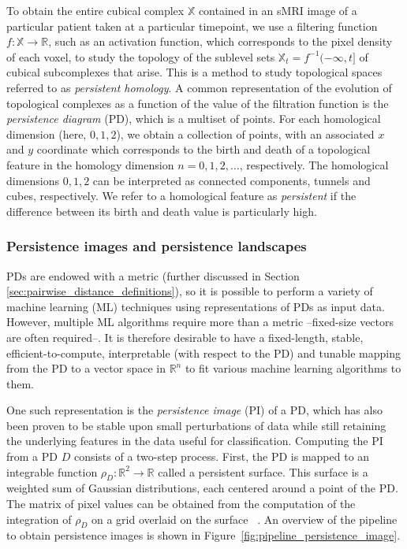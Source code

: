 \documentclass{article}
\begin{document}
To obtain the entire cubical complex $\mathbb{X}$ contained in an sMRI image of a particular patient
taken at a particular timepoint, we use a filtering function $f:\mathbb{X}\to\mathbb{R}$, such as an
activation function, which corresponds to the pixel density of each voxel, to study the topology of
the sublevel sets $\mathbb{X}_t=f^{-1}(-\infty, t]$ of cubical subcomplexes that arise. This is a
method to study topological spaces referred to as \emph{persistent homology}. A common
representation of the evolution of topological complexes as a function of the value of the
filtration function is the \emph{persistence diagram} (PD), which is a multiset of points. For each
homological dimension (here, $0,1,2$), we obtain a collection of points, with an associated $x$ and
$y$ coordinate which corresponds to the birth and death of a topological feature in the homology
dimension $n=0,1,2,\ldots$, respectively. The homological dimensions $0,1,2$ can be interpreted as
connected components, tunnels and cubes, respectively. We refer to a homological feature as
\emph{persistent} if the difference between its birth and death value is particularly high.


\subsubsection{Persistence images and persistence
  landscapes}\label{sec:theory_persistence_landscape_persistence_image}

PDs are endowed with a metric (further discussed in Section
\ref{sec:pairwise_distance_definitions}), so it is possible to perform a variety of machine learning
(ML) techniques using representations of PDs as input data. However, multiple ML algorithms
require more than a metric --fixed-size vectors are often required--. It is therefore
desirable to have a fixed-length, stable, efficient-to-compute, interpretable (with respect to the
PD) and tunable mapping from the PD to a vector space in $\mathbb{R}^n$ to fit various machine
learning algorithms to them.

One such representation is the \emph{persistence image} (PI) of a PD, which has also been proven to
be stable upon small perturbations of data while still retaining the underlying features in the data
useful for classification. Computing the PI from a PD $D$ consists of a two-step process. First, the
PD is mapped to an integrable function $\rho_D : \mathbb{R}^2\to \mathbb{R}$ called a persistent
surface. This surface is a weighted sum of Gaussian distributions, each centered around a point of
the PD. The matrix of pixel values can be obtained from the computation of the integration of
$\rho_D$ on a grid overlaid on the surface ~\citet{adams2017persistence}. An overview of the
pipeline to obtain persistence images is shown in Figure~\ref{fig:pipeline_persistence_image}.
\end{document}
